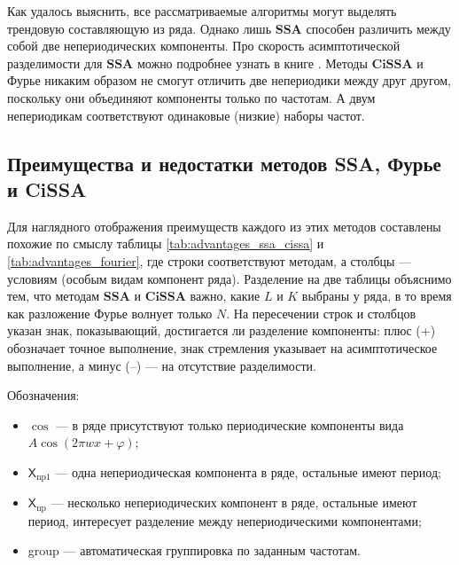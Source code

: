 \documentclass[a4paper, 11pt]{article}
\newcommand{\SSA}{\textbf{SSA}}
\newcommand{\CISSA}{\textbf{CiSSA}}
\newcommand{\TS}{\mathsf{X}}
\begin{document}
Как удалось выяснить, все рассматриваемые алгоритмы могут выделять трендовую составляющую из ряда. Однако лишь $\SSA$ способен различить между собой две непериодических компоненты. Про скорость асимптотической разделимости для $\SSA$ можно подробнее узнать в книге \cite{golyandina2001analysis}. Методы $\CISSA$ и Фурье никаким образом не смогут отличить две непериодики между друг другом, поскольку они объединяют компоненты только по частотам. А двум непериодикам соответствуют одинаковые (низкие) наборы частот.


\subsection{Преимущества и недостатки методов SSA, Фурье и CiSSA}

Для наглядного отображения преимуществ каждого из этих методов составлены похожие по смыслу таблицы \ref{tab:advantages_ssa_cissa} и \ref{tab:advantages_fourier}, где строки соответствуют методам, а столбцы --- условиям (особым видам компонент ряда). Разделение на две таблицы объяснимо тем, что методам $\SSA$ и $\CISSA$ важно, какие $L$ и  $K$ выбраны у ряда, в то время как разложение Фурье волнует только $N$. На пересечении строк и столбцов указан знак, показывающий, достигается ли разделение компоненты: плюс (+) обозначает точное выполнение, знак стремления указывает на асимптотическое выполнение, а минус (–) --- на отсутствие разделимости.

Обозначения:
\begin{itemize}
	\item $\cos$ --- в ряде присутствуют только периодические компоненты вида $A\cos(2\pi w x + \varphi)$;
	\item $\TS_{\mathrm{np}1}$ --- одна непериодическая компонента в ряде, остальные имеют период;
	\item $\TS_{\mathrm{np}}$ --- несколько непериодических компонент в ряде, остальные имеют период, интересует разделение между
	      непериодическими компонентами;
	\item group --- автоматическая группировка по заданным частотам.
\end{itemize}
\end{document}
